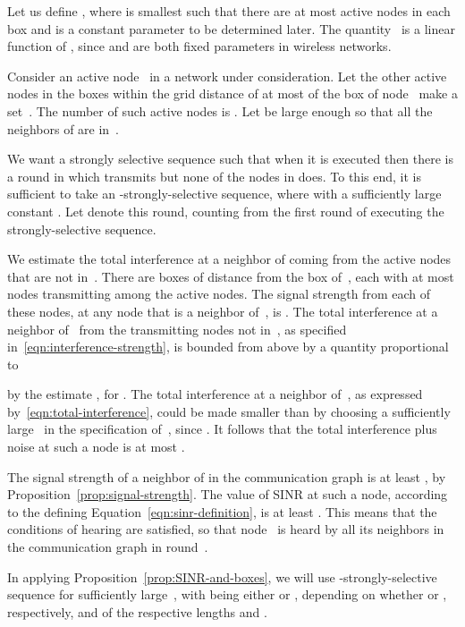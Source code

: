 \documentclass[11pt]{article}
\newcommand{\qed}{\hfill  \smallskip}
\newenvironment{proof}{\noindent{\bf Proof:}}{\qed}
\begin{document}
\begin{proof}
Let us define , where  is smallest such that there are at most  active nodes in each box and  is a constant parameter to be determined later.
The quantity~ is a linear function of , since  and  are both fixed parameters in wireless networks.

Consider an active node~ in a network under consideration.
Let the other active nodes in the boxes within the grid distance of at most   of the box of node~ make a set~.
The number of such active nodes is . 
Let  be large enough so that all the neighbors of  are in~.

We want a strongly selective sequence such that when it is executed then there is a round in which  transmits but none of the nodes in  does.
To this end, it is sufficient to take an -strongly-selective sequence, where  with a sufficiently large constant .
Let  denote this round, counting from the first round of executing the strongly-selective sequence.

We estimate the total interference at a neighbor of  coming from the active nodes that are not in~.
There are  boxes of distance  from the box of~, each with at most  nodes transmitting among the active nodes.
The signal strength  from each of these nodes, at any node that is a neighbor of~,  is .
The total interference at a neighbor of~ from the transmitting nodes not in~, as specified in~\eqref{eqn:interference-strength}, is bounded from above by a quantity proportional to 

by the estimate , for .
The total interference at a neighbor of~, as expressed by~\eqref{eqn:total-interference}, could be made  smaller than  by choosing a sufficiently large~ in the specification of~, since .
It follows that the total interference plus noise at such a node is at most .

The signal strength of a neighbor of  in the communication graph is at least , by Proposition~\ref{prop:signal-strength}.
The value of SINR at such a node, according to the defining Equation~\eqref{eqn:sinr-definition}, is at least .
This means that the conditions of hearing are satisfied, so that  node~ is heard by all its neighbors in the communication graph in round~.
\end{proof}

In applying Proposition~\ref{prop:SINR-and-boxes}, we will use -strongly-selective sequence for sufficiently large~, with  being either  or , depending on whether  or , respectively, and of the respective lengths  and .
\end{document}
